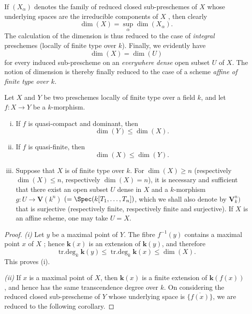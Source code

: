 If $(X_\alpha)$ denotes the family of reduced closed sub-preschemes of $X$ whose underlying spaces are the irreducible components of $X$ , then clearly
\begin{equation}
\dim(X)=\sup_\alpha\dim(X_\alpha).
\tag{4.1.1.2}
\label{IV.4.1.1.2}
\end{equation}
The calculation of the dimension is thus reduced to the case of \emph{integral} preschemes (locally of finite type over $k$).
Finally, we evidently have
\begin{equation}
\dim(X)=\dim(U)
\tag{4.1.1.3}
\label{IV.4.1.1.3}
\end{equation}
for every induced sub-prescheme on an \emph{everywhere dense} open subset $U$ of $X$.
The notion of dimension is thereby finally reduced to the case of a scheme \emph{affine of finite type over $k$}.

\begin{theorem}[4.1.2]
\label{IV.4.1.2}
Let $X$ and $Y$ be two preschemes locally of finite type over a field $k$, and let $f:X\to Y$ be a $k$-morphism.


\begin{enumerate}[(i)]
\item[\textup{(i)}] If $f$ is quasi-compact and dominant, then
\[
\dim(Y)\leq\dim(X).
\]
\item[\textup{(ii)}] If $f$ is quasi-finite, then
\[
\dim(X)\leq\dim(Y).
\]
\item[\textup{(iii)}] Suppose that $X$ is of finite type over $k$.
For $\dim(X)\geq n$ \textup{(respectively $\dim(X)\leq n$, respectively $\dim(X)=n$)}, it is necessary and sufficient that there exist an open subset $U$ dense in $X$ and a $k$-morphism
$g:U\longrightarrow\mathbf{V}(k^n)$
$(=\Spec(k[T_1,\ldots,T_n])$, which we shall also denote by $\mathbf{V}_k^n)$
that is surjective \textup{(respectively} finite, \textup{respectively} finite and surjective\textup{)}.
If $X$ is an affine scheme, one may take $U=X$.
\end{enumerate}
\end{theorem}

\begin{proof}
\emph{(i)} Let $y$ be a maximal point of $Y$.
The fibre $f^{-1}(y)$ contains a maximal point $x$ of $X$ ; hence $\boldsymbol{k}(x)$ is an extension of $\boldsymbol{k}(y)$, and therefore
\[
\operatorname{tr.deg}_k\boldsymbol{k}(y)
\leq
\operatorname{tr.deg}_k\boldsymbol{k}(x)
\leq
\dim(X).
\]
This proves (i).

\emph{(ii)} If $x$ is a maximal point of $X$, then $\boldsymbol{k}(x)$ is a finite extension of $\boldsymbol{k}(f(x))$ , and hence has the same transcendence degree over $k$.
On considering the reduced closed sub-prescheme of $Y$ whose underlying space is $\overline{\{f(x)\}}$, we are reduced to the following corollary.
\end{proof}

